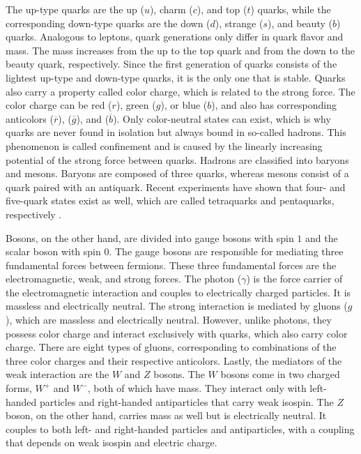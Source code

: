 The up-type quarks are the up ($u$), charm ($c$), and top ($t$) quarks, while the corresponding
down-type quarks are the down ($d$), strange ($s$), and beauty ($b$) quarks. Analogous to leptons, 
quark generations only differ in quark flavor and mass. The mass increases from the up to the top quark
and from the down to the beauty quark, respectively. Since the first generation of quarks consists of the 
lightest up-type and down-type quarks, it is the only one that is stable.
Quarks also carry a property called color charge, which is related to the strong
force. The color charge can be red ($r$), green ($g$), or blue ($b$), and
also has corresponding anticolors ($\overline{r}$), ($\overline{g}$), and ($\overline{b}$).
Only color-neutral states can exist, which is why quarks are never found in isolation but always bound in so-called hadrons.
This phenomenon is called confinement and is caused by the linearly increasing potential of the strong force between
quarks. Hadrons are classified into baryons and mesons. Baryons are composed of three quarks,
whereas mesons consist of a quark paired with an antiquark. Recent experiments have shown that four- and five-quark states
exist as well, which are called tetraquarks and pentaquarks, respectively \cite{tetraquarks, pentaquarks}. 

Bosons, on the other hand, are divided into gauge bosons with spin $1$ and the scalar boson with spin $0$. 
The gauge bosons are responsible for mediating three fundamental forces between fermions. These three fundamental
forces are the electromagnetic, weak, and strong forces. The photon ($\gamma$) is the force carrier
of the electromagnetic interaction and couples to electrically charged particles. It is massless and electrically neutral.
The strong interaction is mediated by gluons ($g$), which are massless and electrically neutral. However, unlike photons,
they possess color charge and interact exclusively with quarks, which also carry color charge. There are eight types of gluons,
corresponding to combinations of the three color charges and their respective anticolors. Lastly, the mediators of the weak
interaction are the $W$ and $Z$ bosons. The $W$ bosons come in two charged forms, $W^+$ and $W^-$, both of which have mass.
They interact only with left-handed particles and right-handed antiparticles that carry weak isospin. 
The $Z$ boson, on the other hand, carries mass as well but is electrically neutral. It couples to both left- and right-handed particles
and antiparticles, with a coupling that depends on weak isospin and electric charge. 


